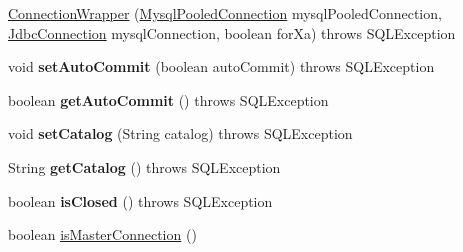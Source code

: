\begin{DoxyCompactItemize}
\item 
\mbox{\hyperlink{classcom_1_1mysql_1_1cj_1_1jdbc_1_1_connection_wrapper_a6dbecfe42d98fb8c3f0ff7081ccc07cf}{Connection\+Wrapper}} (\mbox{\hyperlink{classcom_1_1mysql_1_1cj_1_1jdbc_1_1_mysql_pooled_connection}{Mysql\+Pooled\+Connection}} mysql\+Pooled\+Connection, \mbox{\hyperlink{interfacecom_1_1mysql_1_1cj_1_1jdbc_1_1_jdbc_connection}{Jdbc\+Connection}} mysql\+Connection, boolean for\+Xa)  throws S\+Q\+L\+Exception 
\item 
\mbox{\label{classcom_1_1mysql_1_1cj_1_1jdbc_1_1_connection_wrapper_aabb56a4ee8754e61709454d48379bbe4}} 
void {\bfseries set\+Auto\+Commit} (boolean auto\+Commit)  throws S\+Q\+L\+Exception 
\item 
\mbox{\label{classcom_1_1mysql_1_1cj_1_1jdbc_1_1_connection_wrapper_ac839f2b5d2e5f2c5a6b9e29c922578c0}} 
boolean {\bfseries get\+Auto\+Commit} ()  throws S\+Q\+L\+Exception 
\item 
\mbox{\label{classcom_1_1mysql_1_1cj_1_1jdbc_1_1_connection_wrapper_a86b87e7280723520f0a14160f927d5ef}} 
void {\bfseries set\+Catalog} (String catalog)  throws S\+Q\+L\+Exception 
\item 
\mbox{\label{classcom_1_1mysql_1_1cj_1_1jdbc_1_1_connection_wrapper_af0dd144455d23990970f785e0236684b}} 
String {\bfseries get\+Catalog} ()  throws S\+Q\+L\+Exception 
\item 
\mbox{\label{classcom_1_1mysql_1_1cj_1_1jdbc_1_1_connection_wrapper_a9197d0be68cabb03aec34d3f1fdf3c72}} 
boolean {\bfseries is\+Closed} ()  throws S\+Q\+L\+Exception 
\item 
boolean \mbox{\hyperlink{classcom_1_1mysql_1_1cj_1_1jdbc_1_1_connection_wrapper_a7e344c8e7ee5db8d3e1a0aa96bd6e1fd}{is\+Master\+Connection}} ()
\item 
\mbox{\label{classcom_1_1mysql_1_1cj_1_1jdbc_1_1_connection_wrapper_ad509e7bbbdf0dd5e76bdc7830ef1dc9d}} 

\end{DoxyCompactItemize}
